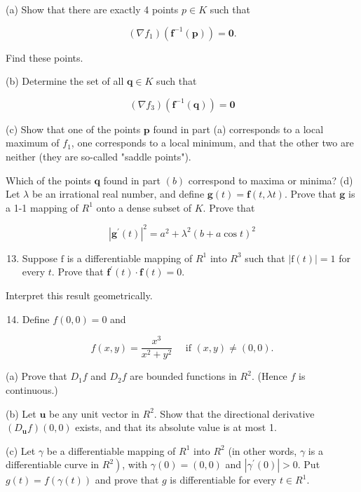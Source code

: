 \documentclass[10pt]{article}
\begin{document}
(a) Show that there are exactly 4 points $p \in K$ such that

$$
\left(\nabla f_{1}\right)\left(\mathbf{f}^{-1}(\mathbf{p})\right)=\mathbf{0} .
$$

Find these points.

(b) Determine the set of all $\mathbf{q} \in K$ such that

$$
\left(\nabla f_{3}\right)\left(\mathbf{f}^{-1}(\mathbf{q})\right)=\mathbf{0}
$$

(c) Show that one of the points $\mathbf{p}$ found in part (a) corresponds to a local maximum of $f_{1}$, one corresponds to a local minimum, and that the other two are neither (they are so-called "saddle points").

Which of the points $\mathbf{q}$ found in part $(b)$ correspond to maxima or minima? (d) Let $\lambda$ be an irrational real number, and define $\mathbf{g}(t)=\mathbf{f}(t, \lambda t)$. Prove that $\mathbf{g}$ is a 1-1 mapping of $R^{1}$ onto a dense subset of $K$. Prove that

$$
\left|\mathbf{g}^{\prime}(t)\right|^{2}=a^{2}+\lambda^{2}(b+a \cos t)^{2}
$$

\begin{enumerate}
  \setcounter{enumi}{12}
  \item Suppose $\mathrm{f}$ is a differentiable mapping of $R^{1}$ into $R^{3}$ such that $|\mathrm{f}(t)|=1$ for every $t$. Prove that $\mathbf{f}^{\prime}(t) \cdot \mathbf{f}(t)=0$.
\end{enumerate}

Interpret this result geometrically.

\begin{enumerate}
  \setcounter{enumi}{13}
  \item Define $f(0,0)=0$ and
\end{enumerate}

$$
f(x, y)=\frac{x^{3}}{x^{2}+y^{2}} \quad \text { if }(x, y) \neq(0,0) .
$$

(a) Prove that $D_{1} f$ and $D_{2} f$ are bounded functions in $R^{2}$. (Hence $f$ is continuous.)

(b) Let $\mathbf{u}$ be any unit vector in $R^{2}$. Show that the directional derivative $\left(D_{\mathbf{u}} f\right)(0,0)$ exists, and that its absolute value is at most 1.

(c) Let $\gamma$ be a differentiable mapping of $R^{1}$ into $R^{2}$ (in other words, $\gamma$ is a differentiable curve in $\left.R^{2}\right)$, with $\gamma(0)=(0,0)$ and $\left|\gamma^{\prime}(0)\right|>0$. Put $g(t)=f(\gamma(t))$ and prove that $g$ is differentiable for every $t \in R^{1}$.
\end{document}
